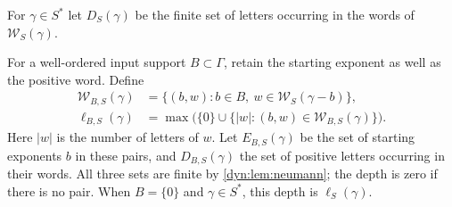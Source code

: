 \documentclass[11pt,letterpaper]{article}
\theoremstyle{definition}
\theoremstyle{remark}
\newcommand{\word}{\mathcal W}
\numberwithin{equation}{section}
\begin{document}
For $\gamma\in S^{*}$ let $D_S(\gamma)$ be the finite set of letters
occurring in the words of $\word_S(\gamma)$.

For a well-ordered input support $B\subset\Gamma$, retain the starting
exponent as well as the positive word. Define
\begin{align*}
 \word_{B,S}(\gamma)
 &=\{(b,w):b\in B,\ w\in\word_S(\gamma-b)\},\\
 \ell_{B,S}(\gamma)
 &=\max\bigl(\{0\}\cup\{|w|:(b,w)\in\word_{B,S}(\gamma)\}\bigr).
\end{align*}
Here $|w|$ is the number of letters of $w$. Let $E_{B,S}(\gamma)$ be the
set of starting exponents $b$ in these pairs, and $D_{B,S}(\gamma)$ the set
of positive letters occurring in their words. All three sets are finite by
\cref{dyn:lem:neumann}; the depth is zero if there is no pair. When
$B=\{0\}$ and $\gamma\in S^{*}$, this depth is $\ell_S(\gamma)$.
\end{document}
